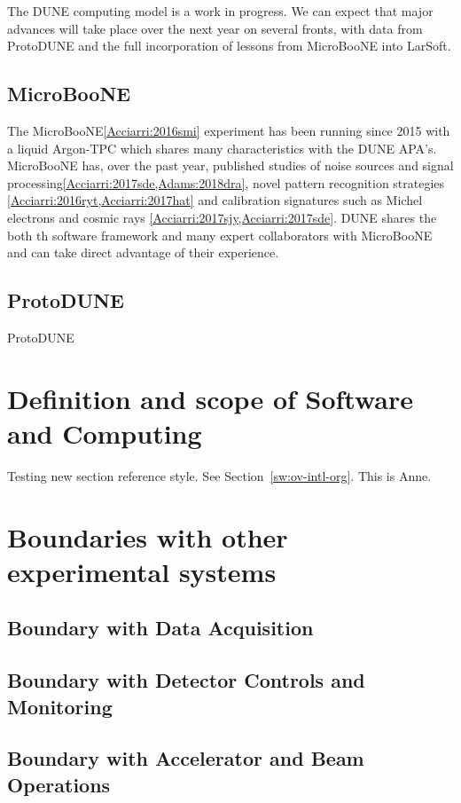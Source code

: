The DUNE computing model is a work in progress.  We can expect that major advances will take place over the next year on several fronts, with data from ProtoDUNE and the full incorporation of lessons from MicroBooNE into LarSoft. 

\subsection{MicroBooNE}\label{sw:MB-input}

The MicroBooNE\ref{Acciarri:2016smi} experiment has been running since 2015 with a liquid Argon-TPC which shares many characteristics with the DUNE APA's.   MicroBooNE has, over the past year, published studies of noise sources and signal processing\ref{Acciarri:2017sde,Adams:2018dra}, novel pattern recognition strategies \ref{Acciarri:2016ryt,Acciarri:2017hat} and calibration signatures such as Michel electrons and cosmic rays \ref{Acciarri:2017sjy,Acciarri:2017sde}.  DUNE shares the both th \larsoft software framework and many expert collaborators with MicroBooNE and can take direct advantage of their experience. 

\subsection{ProtoDUNE}\label{sw:PD-planning}

ProtoDUNE 


\section{Definition and scope of Software and Computing}

Testing new section reference style. See Section~\ref{sw:ov-intl-org}. This is Anne.
\section{Boundaries with other experimental systems}
\subsection{Boundary with Data Acquisition}
\subsection{Boundary with Detector Controls and Monitoring}
\subsection{Boundary with Accelerator and Beam Operations}
